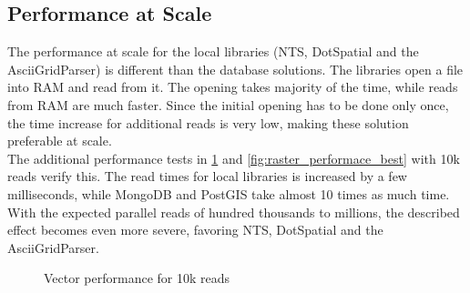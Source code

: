 \subsection{Performance at Scale}
The performance at scale for the local libraries (NTS, DotSpatial and the AsciiGridParser) is different than the database solutions. The libraries open a file into RAM and read from it. The opening takes majority of the time, while reads from RAM are much faster. Since the initial opening has to be done only once, the time increase for additional reads is very low, making these solution preferable at scale.\\
The additional performance tests in \ref{fig:vector_performace_best} and \ref{fig:raster_performace_best} with 10k reads verify this. The read times for local libraries is increased by a few milliseconds, while MongoDB and PostGIS take almost 10 times as much time. With the expected parallel reads of hundred thousands to millions, the described effect becomes even more severe, favoring NTS, DotSpatial and the AsciiGridParser.

\begin{figure}[H]
	\caption{Vector performance for 10k reads}
	\label{fig:vector_performace_best}
\end{figure}

